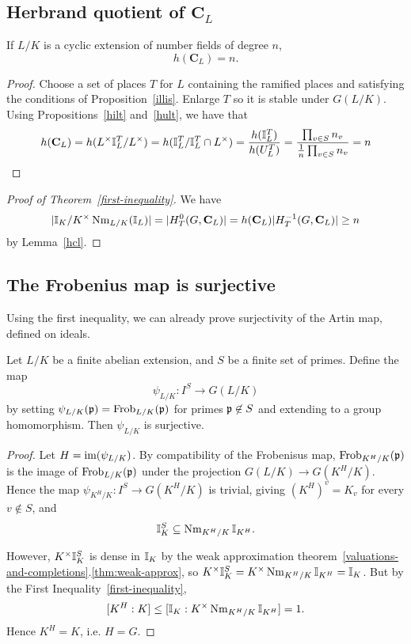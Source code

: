 \subsection{Herbrand quotient of $\mathbf C_L$}

\begin{lem}
If $L/K$ is a cyclic extension of number fields of degree $n$,
\[h(\mathbf C_L)=n.\]
\end{lem}
\begin{proof}
Choose a set of places $T$ for $L$ containing the ramified %
places and satisfying the conditions of Proposition~\ref{illis}. Enlarge $T$ so it is stable under $G(L/K)$. %
Using Propositions~\ref{hilt} and~\ref{hult}, we have that
\[
h(\mathbf C_L)=h(L^{\times}\mathbb{I}_L^T/L^{\times})
=h(\mathbb{I}_L^T/\mathbb{I}_L^T\cap L^{\times})=\frac{h(\mathbb{I}_L^T)}{h(U_L^T)}=\frac{\prod_{v\in S} n_v}{\frac{1}{n}\prod_{v\in S} n_v}=n
\]
\end{proof}
\begin{proof}[Proof of Theorem~\ref{first-inequality}]
We have
\[
|\mathbb{I}_K/K^{\times} \operatorname{Nm}_{L/K}(\mathbb{I}_L)|=|H_T^0(G,\mathbf C_L)|
=h(\mathbf C_L)|H_T^{-1}(G,\mathbf C_L)|\ge n
\]
by Lemma~\ref{hcl}.
\end{proof}
\subsection{The Frobenius map is surjective}
Using the first inequality, we can already prove surjectivity of the Artin map, defined on ideals.
\begin{pr}
Let $L/K$ be a finite abelian extension, and $S$ be a finite set of primes. Define the map
\[
\psi_{L/K}:I^S\to G(L/K)
\]
by setting $\psi_{L/K}(\mathfrak{p})=\operatorname{Frob}_{L/K}(\mathfrak{p})$ for primes $\mathfrak{p}\not\in S$ and extending to a group homomorphism. Then $\psi_{L/K}$ is surjective.
\end{pr}
\begin{proof}
Let $H=\text{im}(\psi_{L/K})$. By compatibility of the Frobenisus map, $\operatorname{Frob}_{K^H/K}(\mathfrak{p})$ is the image of $\operatorname{Frob}_{L/K}(\mathfrak{p})$ under the projection $G(L/K)\to G(K^H/K)$. Hence the map $\psi_{K^H/K}:I^S\to G(K^H/K)$ is trivial, giving $(K^H)^v=K_v$ for every $v\nin S$, and
\[
\mathbb{I}_K^S\subseteq \operatorname{Nm}_{K^H/K}\mathbb{I}_{K^H}.
\]

However, $K^{\times}\mathbb{I}_K^S$ is dense in $\mathbb{I}_K$ by the weak approximation theorem~\ref{valuations-and-completions}.\ref{thm:weak-approx}, so $K^{\times}\mathbb{I}_K^S= K^{\times}\operatorname{Nm}_{K^H/K}\mathbb{I}_{K^H}=\mathbb{I}_K$. But by the First Inequality~\ref{first-inequality}, 
\[[K^H:K]\le [\mathbb{I}_K:K^{\times}\operatorname{Nm}_{K^H/K}\mathbb{I}_{K^H}]=1.\]
Hence $K^H=K$, i.e. $H=G$. 
\end{proof}
